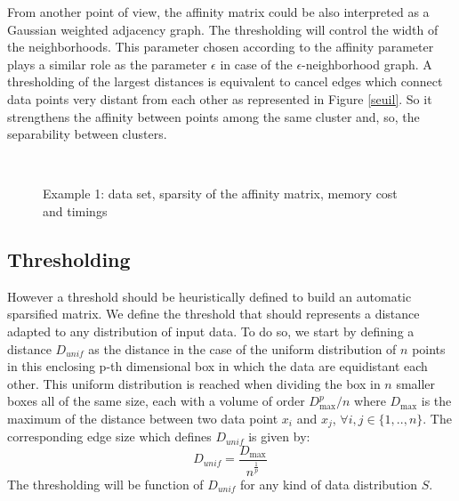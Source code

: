 \documentclass{llncs}
\begin{document}
From another point of view, the affinity matrix could be also interpreted as a
Gaussian weighted adjacency graph.
The thresholding will control the width of the neighborhoods. This parameter
chosen according to the affinity parameter  plays a similar role as the
parameter $\epsilon$ in case of the $\epsilon$-neighborhood graph. A
thresholding of the largest distances is equivalent to
cancel edges which connect data points very distant from each other as
represented in Figure \ref{seuil}. So it strengthens the affinity between
points among the same cluster and, so,  the separability between clusters.


\begin{figure}[!h]
  \begin{center}
    \hspace{2cm}
    \\
    \hspace{2cm}
  \end{center}
  \caption{Example 1: data set, sparsity of the affinity matrix, memory cost and timings}
  \label{4rect}
 \end{figure}


\subsection{Thresholding}
\label{threshold}

However a threshold should be heuristically defined to build an automatic sparsified matrix. We define the threshold that should represents a distance  adapted to any distribution of input data.  To do so, we start by defining a distance $D_{unif}$ as the distance in the case of the uniform distribution of $n$ points
in this enclosing p-th dimensional box in which the data are equidistant each other. This uniform distribution is reached
when dividing the box in $n$ smaller boxes all of the same size, each with
a volume of order $ D_{\max}^p / n$ where $D_{\max}$ is the maximum of the distance between two data point $x_i$ and $x_j$, $\forall i,j\in \{1,..,n\}$.
The corresponding edge size which defines $D_{unif}$ is given by:
\begin{equation}
D_{unif} = \frac{D_{\max}}{n^{\frac{1}{p}}} \, \label{factor}
 \end{equation}
The  thresholding will be function of $D_{unif}$ for any kind of data distribution $S$. 
\end{document}
